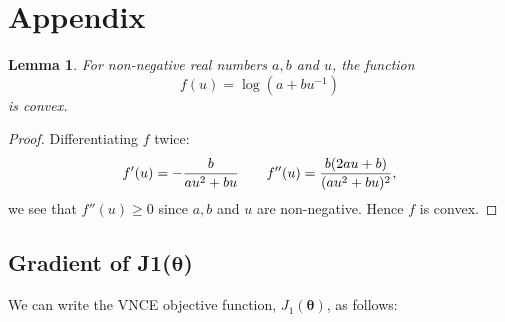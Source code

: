 \documentclass[11pt, oneside]{article}
\newcommand{\thetab}{{\boldsymbol{\theta}}}
\newtheorem{lemma}[theorem]{Lemma}
\theoremstyle{definition}
\begin{document}
{%



\newpage
\section{Appendix}

\begin{lemma}
\label{lemma: f convex}
For non-negative real numbers $a, b$ and $u$, the function 
\begin{equation}
    f(u) = \log(a + bu^{-1})
\end{equation}
is convex.
\end{lemma}
\begin{proof}
Differentiating $f$ twice:
    \begin{align}
        f'(u) = - \frac{b}{au^2 + bu} \hspace{7mm} f''(u) = \frac{b(2au + b)}{(au^2 + bu)^2},
    \end{align}
we see that $f''(u) \geq 0$ since $a, b$ and $u$ are non-negative. Hence $f$ is convex.
\end{proof}



\subsection{Gradient of J1($\thetab$)}
\label{sec:appendix grad of J1}
We can write the VNCE objective function, $J_1(\thetab)$, as follows:

}
\end{document}
